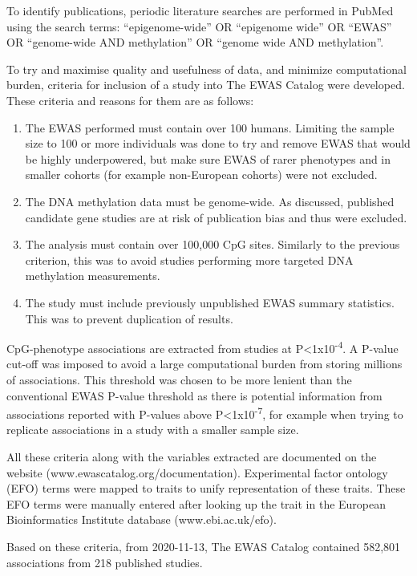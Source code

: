 \documentclass[11pt,twoside]{bristolthesis}
\providecommand{\tightlist}{%
  \setlength{\itemsep}{0pt}\setlength{\parskip}{0pt}}
\begin{document}
To identify publications, periodic literature searches are performed in PubMed using the search terms: ``epigenome-wide'' OR ``epigenome wide'' OR ``EWAS'' OR ``genome-wide AND methylation'' OR ``genome wide AND methylation''.

To try and maximise quality and usefulness of data, and minimize computational burden, criteria for inclusion of a study into The EWAS Catalog were developed. These criteria and reasons for them are as follows:
\begin{enumerate}
\def\labelenumi{\arabic{enumi}.}
\tightlist
\item
  The EWAS performed must contain over 100 humans. Limiting the sample size to 100 or more individuals was done to try and remove EWAS that would be highly underpowered, but make sure EWAS of rarer phenotypes and in smaller cohorts (for example non-European cohorts) were not excluded.
\item
  The DNA methylation data must be genome-wide. As discussed, published candidate gene studies are at risk of publication bias and thus were excluded.
\item
  The analysis must contain over 100,000 CpG sites. Similarly to the previous criterion, this was to avoid studies performing more targeted DNA methylation measurements.
\item
  The study must include previously unpublished EWAS summary statistics. This was to prevent duplication of results.
\end{enumerate}
CpG-phenotype associations are extracted from studies at P\textless1x10\textsuperscript{-4}. A P-value cut-off was imposed to avoid a large computational burden from storing millions of associations. This threshold was chosen to be more lenient than the conventional EWAS P-value threshold as there is potential information from associations reported with P-values above P\textless1x10\textsuperscript{-7}, for example when trying to replicate associations in a study with a smaller sample size.

All these criteria along with the variables extracted are documented on the website (www.ewascatalog.org/documentation). Experimental factor ontology (EFO) terms were mapped to traits to unify representation of these traits. These EFO terms were manually entered after looking up the trait in the European Bioinformatics Institute database (www.ebi.ac.uk/efo).

Based on these criteria, from 2020-11-13, The EWAS Catalog contained 582,801 associations from 218 published studies.
\end{document}
